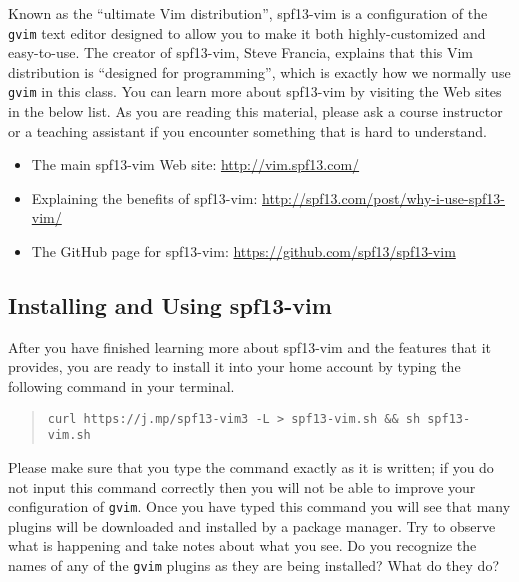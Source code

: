 Known as the ``ultimate Vim distribution'', spf13-vim is a configuration of the {\tt gvim} text editor designed to allow
you to make it both highly-customized and easy-to-use.  The creator of spf13-vim, Steve Francia, explains that this Vim
distribution is ``designed for programming'', which is exactly how we normally use {\tt gvim} in this class. You can
learn more about spf13-vim by visiting the Web sites in the below list.  As you are reading this material, please ask a course
instructor or a teaching assistant if you encounter something that is hard to understand.

\vspace*{-.1in}
\begin{itemize}
  \setlength{\itemsep}{.01in}
  \item The main spf13-vim Web site: \url{http://vim.spf13.com/}
  \item Explaining the benefits of spf13-vim: \url{http://spf13.com/post/why-i-use-spf13-vim/}
  \item The GitHub page for spf13-vim: \url{https://github.com/spf13/spf13-vim}
\end{itemize}

\vspace*{-.30in}
\subsection*{Installing and Using spf13-vim}
\vspace*{-.05in}

After you have finished learning more about spf13-vim and the features that it provides, you are ready to install it
into your home account by typing the following command in your terminal.

\vspace*{-.125in}
\begin{quote}
  {\tt curl https://j.mp/spf13-vim3 -L > spf13-vim.sh \&\& sh spf13-vim.sh}
\end{quote}
\vspace*{-.125in}

Please make sure that you type the command exactly as it is written; if you do not input this command correctly then you
will not be able to improve your configuration of {\tt gvim}. Once you have typed this command you will see that many
plugins will be downloaded and installed by a package manager.  Try to observe what is happening and take notes about
what you see. Do you recognize the names of any of the {\tt gvim} plugins as they are being installed? What do they do?

